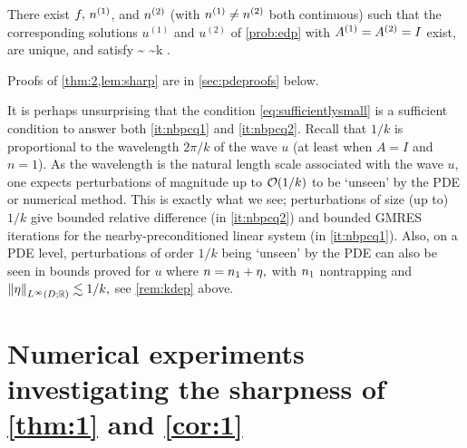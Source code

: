 \ble[Sharpness of the bound \cref{eq:PDEbound} when $\Aso = \Ast= I$]\label{lem:sharp}
There exist $f, \,{n}^{(1)}$, and ${n}^{(2)}$ (with ${n}^{(1)}\neq {n}^{(2)}$ both continuous) such that 
the corresponding solutions $u^{(1)}$ and $u^{(2)}$ of \cref{prob:edp} with $\Aso = \Ast= I$ exist, are unique, and satisfy
\beq\label{eq:sharp1}
\sim 
{}\sim k \NLiDRR{\nso-\nst}.
\eeq
\ele

Proofs of \cref{thm:2,lem:sharp} are in \cref{sec:pdeproofs} below.

\label{rem:physical1k}
It is perhaps unsurprising that the condition \cref{eq:sufficientlysmall} is a sufficient condition to answer both \cref{it:nbpcq1} and \cref{it:nbpcq2}. Recall that $1/k$ is proportional to the wavelength $2\pi/k$ of the wave $u$ (at least when $A=I$ and $n=1$). As the wavelength is the natural length scale associated with the wave $u$, one expects perturbations of magnitude up to $\mathcal O(1/k)$ to be `unseen' by the PDE or numerical method. This is exactly what we see; perturbations of size (up to) $1/k$ give bounded relative difference (in \cref{it:nbpcq2}) and bounded GMRES iterations for the nearby-preconditioned linear system (in \cref{it:nbpcq1}). Also, on a PDE level, perturbations of order $1/k$ being `unseen' by the PDE can also be seen in bounds proved for $u$ where $n = n_{1} + \eta,$ with $n_{1}$ nontrapping and $\NLiDRR{\eta} \lesssim 1/k,$ see \cref{rem:kdep} above.
\ere


\section{Numerical experiments investigating the sharpness of \cref{thm:1} and \cref{cor:1}}\label{sec:num}

